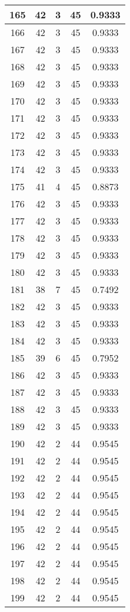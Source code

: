 \documentclass[letterpaper, 12pt]{article}
\begin{document}
\begin{longtable}{|c|c|c|c|c|}
\hline
165 & 42 & 3 & 45 & 0.9333 \\
\hline
166 & 42 & 3 & 45 & 0.9333 \\
\hline
167 & 42 & 3 & 45 & 0.9333 \\
\hline
168 & 42 & 3 & 45 & 0.9333 \\
\hline
169 & 42 & 3 & 45 & 0.9333 \\
\hline
170 & 42 & 3 & 45 & 0.9333 \\
\hline
171 & 42 & 3 & 45 & 0.9333 \\
\hline
172 & 42 & 3 & 45 & 0.9333 \\
\hline
173 & 42 & 3 & 45 & 0.9333 \\
\hline
174 & 42 & 3 & 45 & 0.9333 \\
\hline
175 & 41 & 4 & 45 & 0.8873 \\
\hline
176 & 42 & 3 & 45 & 0.9333 \\
\hline
177 & 42 & 3 & 45 & 0.9333 \\
\hline
178 & 42 & 3 & 45 & 0.9333 \\
\hline
179 & 42 & 3 & 45 & 0.9333 \\
\hline
180 & 42 & 3 & 45 & 0.9333 \\
\hline
181 & 38 & 7 & 45 & 0.7492 \\
\hline
182 & 42 & 3 & 45 & 0.9333 \\
\hline
183 & 42 & 3 & 45 & 0.9333 \\
\hline
184 & 42 & 3 & 45 & 0.9333 \\
\hline
185 & 39 & 6 & 45 & 0.7952 \\
\hline
186 & 42 & 3 & 45 & 0.9333 \\
\hline
187 & 42 & 3 & 45 & 0.9333 \\
\hline
188 & 42 & 3 & 45 & 0.9333 \\
\hline
189 & 42 & 3 & 45 & 0.9333 \\
\hline
190 & 42 & 2 & 44 & 0.9545 \\
\hline
191 & 42 & 2 & 44 & 0.9545 \\
\hline
192 & 42 & 2 & 44 & 0.9545 \\
\hline
193 & 42 & 2 & 44 & 0.9545 \\
\hline
194 & 42 & 2 & 44 & 0.9545 \\
\hline
195 & 42 & 2 & 44 & 0.9545 \\
\hline
196 & 42 & 2 & 44 & 0.9545 \\
\hline
197 & 42 & 2 & 44 & 0.9545 \\
\hline
198 & 42 & 2 & 44 & 0.9545 \\
\hline
199 & 42 & 2 & 44 & 0.9545 \\
\hline
\end{longtable}
\end{document}
